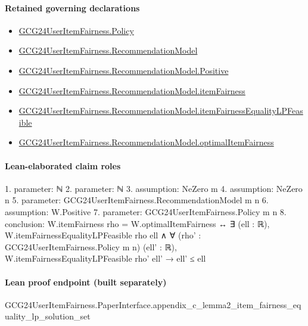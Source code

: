 \documentclass[10pt]{article}
\begin{document}
\paragraph{Retained governing declarations}
\begin{itemize}\raggedright
\item \hyperlink{governing-declaration-34ca6b905b48428a}{GCG24\allowbreak{}User\allowbreak{}Item\allowbreak{}Fairness.\allowbreak{}Policy}
\item \hyperlink{governing-declaration-4b845f20f80fb146}{GCG24\allowbreak{}User\allowbreak{}Item\allowbreak{}Fairness.\allowbreak{}Recommendation\allowbreak{}Model}
\item \hyperlink{governing-declaration-7ed309cdf4b5e0ea}{GCG24\allowbreak{}User\allowbreak{}Item\allowbreak{}Fairness.\allowbreak{}Recommendation\allowbreak{}Model.\allowbreak{}Positive}
\item \hyperlink{paper-prerequisite-f7870d3a808a042a}{GCG24\allowbreak{}User\allowbreak{}Item\allowbreak{}Fairness.\allowbreak{}Recommendation\allowbreak{}Model.\allowbreak{}item\allowbreak{}Fairness}
\item \hyperlink{governing-declaration-a4c6217ce33e000a}{GCG24\allowbreak{}User\allowbreak{}Item\allowbreak{}Fairness.\allowbreak{}Recommendation\allowbreak{}Model.\allowbreak{}item\allowbreak{}Fairness\allowbreak{}Equality\allowbreak{}LP\allowbreak{}Feasible}
\item \hyperlink{governing-declaration-3079e6c40671c151}{GCG24\allowbreak{}User\allowbreak{}Item\allowbreak{}Fairness.\allowbreak{}Recommendation\allowbreak{}Model.\allowbreak{}optimal\allowbreak{}Item\allowbreak{}Fairness}
\end{itemize}
\paragraph{Lean-elaborated claim roles}\begin{ReviewVerbatim}
1. parameter: ℕ
2. parameter: ℕ
3. assumption: NeZero m
4. assumption: NeZero n
5. parameter: GCG24UserItemFairness.RecommendationModel m n
6. assumption: W.Positive
7. parameter: GCG24UserItemFairness.Policy m n
8. conclusion: W.itemFairness rho = W.optimalItemFairness ↔
  ∃ (ell : ℝ),
    W.itemFairnessEqualityLPFeasible rho ell ∧
      ∀ (rho' : GCG24UserItemFairness.Policy m n) (ell' : ℝ), W.itemFairnessEqualityLPFeasible rho' ell' → ell' ≤ ell
\end{ReviewVerbatim}

\paragraph{Lean proof endpoint (built separately)}\begin{ReviewVerbatim}
GCG24UserItemFairness.PaperInterface.appendix_c_lemma2_item_fairness_equality_lp_solution_set
\end{ReviewVerbatim}
\end{document}
